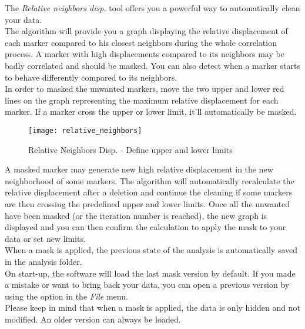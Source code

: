 \indent\indent The \textit{Relative neighbors disp.} tool offers you a powerful way to automatically clean your data.\\
\newline
\indent The algorithm will provide you a graph displaying the relative displacement of each marker compared to his closest neighbors during the whole correlation process. A marker with high displacements compared to its neighbors may be badly correlated and should be masked. You can also detect when a marker starts to behave differently compared to its neighbors.\\
\indent In order to masked the unwanted markers, move the two upper and lower red lines on the graph representing the maximum relative displacement for each marker. If a marker cross the upper or lower limit, it'll automatically be masked.\\

\begin{figure}[!h]
   \centering
   \texttt{[image: relative\_neighbors]}
   \caption{Relative Neighbors Disp. - Define upper and lower limits}
\end{figure}

\newpage
\indent A masked marker may generate new high relative displacement in the new neighborhood of some markers. The algorithm will automatically recalculate the relative displacement after a deletion and continue the cleaning if some markers are then crossing the predefined upper and lower limits. Once all the unwanted have been masked (or the iteration number is reached), the new graph is displayed and you can then confirm the calculation to apply the mask to your data or set new limits.\\
\newline
\indent When a mask is applied, the previous state of the analysis is automatically saved in the analysis folder.\\
On start-up, the software will load the last mask version by default. If you made a mistake or want to bring back your data, you can open a previous version by using the  option in the \textit{File} menu.\\
\newline
\indent Please keep in mind that when a mask is applied, the data is only hidden and not modified. An older version can always be loaded.

